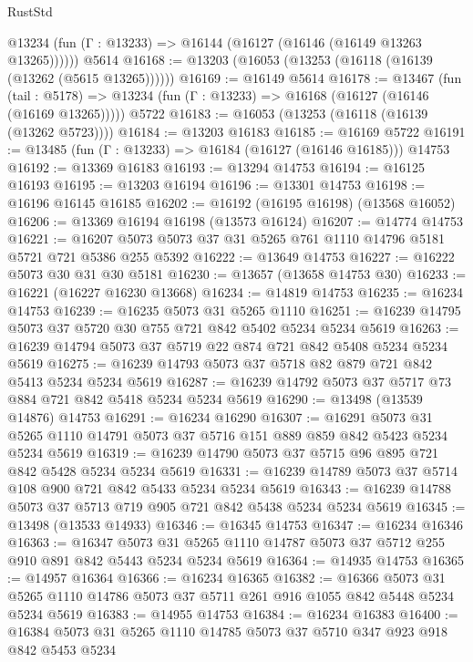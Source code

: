 \begin{lexlean}{RustStd}
\begin{coremodule}
      @13234 (fun (Γ : @13233) => @16144 (@16127 (@16146 (@16149 @13263 @13265))))))
    @5614
@16168 := @13203 (@16053 (@13253 (@16118 (@16139 (@13262 (@5615 @13265))))))
@16169 := @16149 @5614
@16178 := @13467
    (fun (tail : @5178) => @13234 (fun (Γ : @13233) => @16168 (@16127 (@16146 (@16169 @13265)))))
    @5722
@16183 := @16053 (@13253 (@16118 (@16139 (@13262 @5723))))
@16184 := @13203 @16183
@16185 := @16169 @5722
@16191 := @13485 (fun (Γ : @13233) => @16184 (@16127 (@16146 @16185))) @14753
@16192 := @13369 @16183
@16193 := @13294 @14753
@16194 := @16125 @16193
@16195 := @13203 @16194
@16196 := @13301 @14753
@16198 := @16196 @16145 @16185
@16202 := @16192 (@16195 @16198) (@13568 @16052)
@16206 := @13369 @16194 @16198 (@13573 @16124)
@16207 := @14774 @14753
@16221 := @16207 @5073 @5073 @37 @31 @5265 @761 @1110 @14796 @5181 @5721 @721 @5386 @255 @5392
@16222 := @13649 @14753
@16227 := @16222 @5073 @30 @31 @30 @5181
@16230 := @13657 (@13658 @14753 @30)
@16233 := @16221 (@16227 @16230 @13668)
@16234 := @14819 @14753
@16235 := @16234 @14753
@16239 := @16235 @5073 @31 @5265 @1110
@16251 := @16239 @14795 @5073 @37 @5720 @30 @755 @721 @842 @5402 @5234 @5234 @5619
@16263 := @16239 @14794 @5073 @37 @5719 @22 @874 @721 @842 @5408 @5234 @5234 @5619
@16275 := @16239 @14793 @5073 @37 @5718 @82 @879 @721 @842 @5413 @5234 @5234 @5619
@16287 := @16239 @14792 @5073 @37 @5717 @73 @884 @721 @842 @5418 @5234 @5234 @5619
@16290 := @13498 (@13539 @14876) @14753
@16291 := @16234 @16290
@16307 := @16291
    @5073
    @31
    @5265
    @1110
    @14791
    @5073
    @37
    @5716
    @151
    @889
    @859
    @842
    @5423
    @5234
    @5234
    @5619
@16319 := @16239 @14790 @5073 @37 @5715 @96 @895 @721 @842 @5428 @5234 @5234 @5619
@16331 := @16239 @14789 @5073 @37 @5714 @108 @900 @721 @842 @5433 @5234 @5234 @5619
@16343 := @16239 @14788 @5073 @37 @5713 @719 @905 @721 @842 @5438 @5234 @5234 @5619
@16345 := @13498 (@13533 @14933)
@16346 := @16345 @14753
@16347 := @16234 @16346
@16363 := @16347
    @5073
    @31
    @5265
    @1110
    @14787
    @5073
    @37
    @5712
    @255
    @910
    @891
    @842
    @5443
    @5234
    @5234
    @5619
@16364 := @14935 @14753
@16365 := @14957 @16364
@16366 := @16234 @16365
@16382 := @16366
    @5073
    @31
    @5265
    @1110
    @14786
    @5073
    @37
    @5711
    @261
    @916
    @1055
    @842
    @5448
    @5234
    @5234
    @5619
@16383 := @14955 @14753
@16384 := @16234 @16383
@16400 := @16384
    @5073
    @31
    @5265
    @1110
    @14785
    @5073
    @37
    @5710
    @347
    @923
    @918
    @842
    @5453
    @5234

\end{coremodule}
\end{lexlean}
